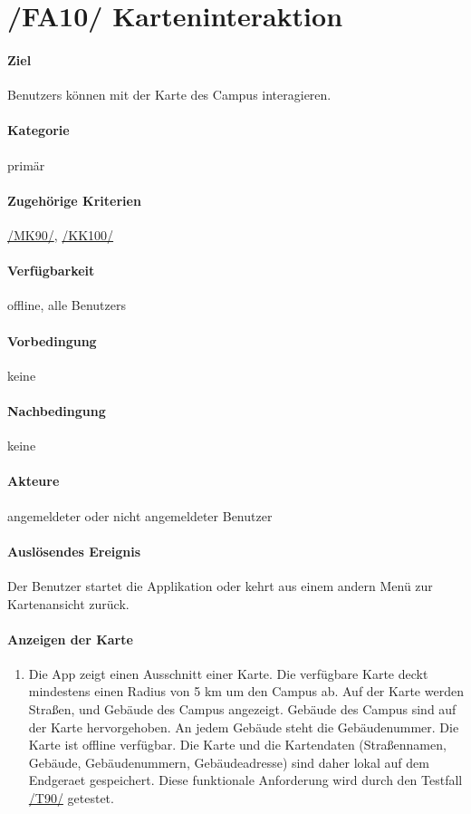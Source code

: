 \section[Karteninteraktion]{/FA10/ Karteninteraktion}
\label{/FA10/}
\paragraph{Ziel}
\Glspl{Benutzer} können mit der \Gls{Karte} des \Gls{Campus} interagieren.
\paragraph{Kategorie}
primär
\paragraph{Zugehörige Kriterien}
\hyperref[/MK90/]{/MK90/}, \hyperref[/KK100/]{/KK100/}
\paragraph{Verfügbarkeit}
\gls{offline}, alle \Glspl{Benutzer}
\paragraph{Vorbedingung}
keine
\paragraph{Nachbedingung}
keine
\paragraph{Akteure}
angemeldeter oder nicht angemeldeter \Gls{Benutzer}
\paragraph{Auslösendes Ereignis}
Der \Gls{Benutzer} startet die Applikation oder kehrt aus einem andern Menü zur \Gls{Kartenansicht} zurück.
\paragraph{Anzeigen der Karte}
\begin{enumerate}[start=11, label=\textbf{/FA\arabic*/}, align=left]
    \item \label{/FA11/} Die App zeigt einen Ausschnitt einer \Gls{Karte}. Die verfügbare \Gls{Karte} deckt mindestens einen Radius von 5 km um den \Gls{Campus} ab. Auf der \Gls{Karte} werden Straßen, und Gebäude des \Gls{Campus} angezeigt. Gebäude des \Gls{Campus} sind auf der \Gls{Karte} hervorgehoben. An jedem Gebäude steht die Gebäudenummer. Die \Gls{Karte} ist \gls{offline} verfügbar. Die \Gls{Karte} und die Kartendaten (Straßennamen, Gebäude, Gebäudenummern, Gebäudeadresse) sind daher \gls{lokal} auf dem \Gls{Endgeraet} gespeichert. Diese funktionale Anforderung wird durch den Testfall \hyperref[/T90/]{/T90/} getestet.
\end{enumerate}
